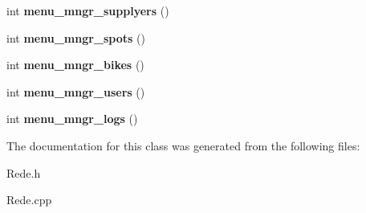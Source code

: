 \begin{DoxyCompactItemize}
\item 
\hypertarget{class_rede_a11e8c9a0d004251882872f9cc3da54da}{int {\bfseries menu\+\_\+mngr\+\_\+supplyers} ()}\label{class_rede_a11e8c9a0d004251882872f9cc3da54da}

\item 
\hypertarget{class_rede_a0d7d6e769f20ff9f3ce54441ec88727e}{int {\bfseries menu\+\_\+mngr\+\_\+spots} ()}\label{class_rede_a0d7d6e769f20ff9f3ce54441ec88727e}

\item 
\hypertarget{class_rede_a2f83a9dde6e018ac57f1aefcfca388b2}{int {\bfseries menu\+\_\+mngr\+\_\+bikes} ()}\label{class_rede_a2f83a9dde6e018ac57f1aefcfca388b2}

\item 
\hypertarget{class_rede_a609866278eb7f37d19397f078a5a6ea6}{int {\bfseries menu\+\_\+mngr\+\_\+users} ()}\label{class_rede_a609866278eb7f37d19397f078a5a6ea6}

\item 
\hypertarget{class_rede_ae11dd331c071a1d4dace9fc89d82e251}{int {\bfseries menu\+\_\+mngr\+\_\+logs} ()}\label{class_rede_ae11dd331c071a1d4dace9fc89d82e251}

\end{DoxyCompactItemize}


The documentation for this class was generated from the following files\+:\begin{DoxyCompactItemize}
\item 
Rede.\+h\item 
Rede.\+cpp\end{DoxyCompactItemize}
